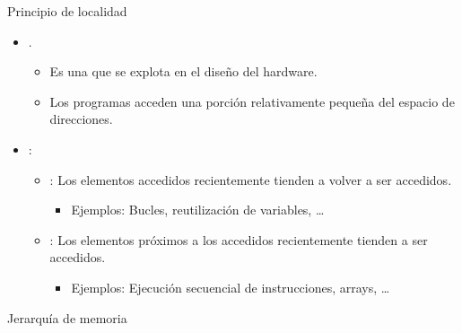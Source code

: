 \begin{frame}[t]{Principio de localidad}
\begin{itemize}
  \item {}.
    \begin{itemize}
      \item Es una  que se explota en el diseño del hardware.
      \item Los programas acceden una porción relativamente pequeña del espacio de direcciones.
    \end{itemize}

  \item {}:
    \begin{itemize}
      \item {}: 
            Los elementos accedidos recientemente tienden a volver a ser accedidos.
        \begin{itemize}
          \item Ejemplos: Bucles, reutilización de variables, \ldots
        \end{itemize}
      \item {}: 
            Los elementos próximos a los accedidos recientemente tienden a ser accedidos.
        \begin{itemize}
          \item Ejemplos: Ejecución secuencial de instrucciones, arrays, \ldots
        \end{itemize}
    \end{itemize}
\end{itemize}
\end{frame}

\begin{frame}[t]{Jerarquía de memoria}
\makebox[\textwidth][c]{

}
\end{frame}

